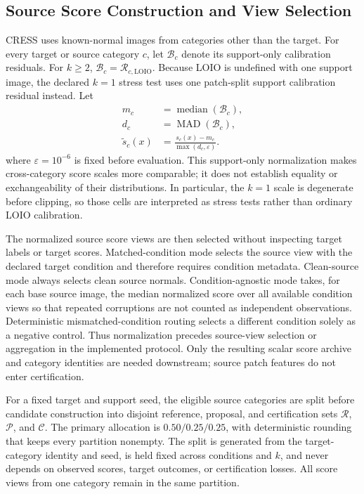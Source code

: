 \subsection{Source Score Construction and View Selection}\label{sec:cress-source-construction}
CRESS uses known-normal images from categories other than the target. For every target or source category $c$, let $\mathcal{B}_c$ denote its support-only calibration residuals. For $k\geq2$, $\mathcal{B}_c=\mathcal{R}_{c,\mathrm{LOIO}}$. Because LOIO is undefined with one support image, the declared $k=1$ stress test uses one patch-split support calibration residual instead. Let
\begin{equation}\label{eq:cress-normalization}
\begin{aligned}
    m_c &= \operatorname{median}(\mathcal{B}_c),\\
    d_c &= \operatorname{MAD}(\mathcal{B}_c),\\
    \widetilde{s}_c(x) &= \frac{s_c(x)-m_c}{\max(d_c,\varepsilon)}.
\end{aligned}
\end{equation}
where $\varepsilon=10^{-6}$ is fixed before evaluation. This support-only normalization makes cross-category score scales more comparable; it does not establish equality or exchangeability of their distributions. In particular, the $k=1$ scale is degenerate before clipping, so those cells are interpreted as stress tests rather than ordinary LOIO calibration.

The normalized source score views are then selected without inspecting target labels or target scores. Matched-condition mode selects the source view with the declared target condition and therefore requires condition metadata. Clean-source mode always selects clean source normals. Condition-agnostic mode takes, for each base source image, the median normalized score over all available condition views so that repeated corruptions are not counted as independent observations. Deterministic mismatched-condition routing selects a different condition solely as a negative control. Thus normalization precedes source-view selection or aggregation in the implemented protocol. Only the resulting scalar score archive and category identities are needed downstream; source patch features do not enter certification.

For a fixed target and support seed, the eligible source categories are split before candidate construction into disjoint reference, proposal, and certification sets $\mathcal{R}$, $\mathcal{P}$, and $\mathcal{C}$. The primary allocation is $0.50/0.25/0.25$, with deterministic rounding that keeps every partition nonempty. The split is generated from the target-category identity and seed, is held fixed across conditions and $k$, and never depends on observed scores, target outcomes, or certification losses. All score views from one category remain in the same partition.


